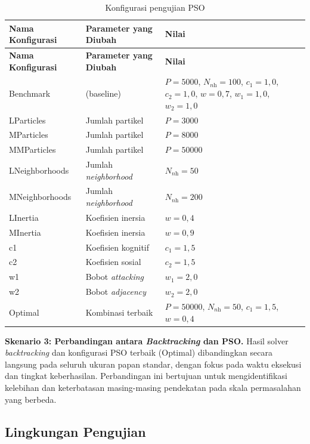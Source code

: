 \begin{longtable}{lp{4cm}p{5.5cm}}
	\caption{Konfigurasi pengujian PSO}
	\label{tab:skenario-pso} \\
	\toprule
	\textbf{Nama Konfigurasi} & \textbf{Parameter yang Diubah} & \textbf{Nilai} \\
	\midrule
	\endfirsthead
	\toprule
	\textbf{Nama Konfigurasi} & \textbf{Parameter yang Diubah} & \textbf{Nilai} \\
	\midrule
	\endhead
	\bottomrule
	\endfoot
	Benchmark & (baseline) & $P{=}5000$, $N_{\textit{nh}}{=}100$, $c_1{=}1{,}0$, $c_2{=}1{,}0$, $w{=}0{,}7$, $w_1{=}1{,}0$, $w_2{=}1{,}0$ \\
	\midrule
	LParticles & Jumlah partikel & $P = 3000$ \\
	\midrule
	MParticles & Jumlah partikel & $P = 8000$ \\
	\midrule
	MMParticles & Jumlah partikel & $P = 50000$ \\
	\midrule
	LNeighborhoods & Jumlah \textit{neighborhood} & $N_{\textit{nh}} = 50$ \\
	\midrule
	MNeighborhoods & Jumlah \textit{neighborhood} & $N_{\textit{nh}} = 200$ \\
	\midrule
	LInertia & Koefisien inersia & $w = 0{,}4$ \\
	\midrule
	MInertia & Koefisien inersia & $w = 0{,}9$ \\
	\midrule
	c1 & Koefisien kognitif & $c_1 = 1{,}5$ \\
	\midrule
	c2 & Koefisien sosial & $c_2 = 1{,}5$ \\
	\midrule
	w1 & Bobot \textit{attacking} & $w_1 = 2{,}0$ \\
	\midrule
	w2 & Bobot \textit{adjacency} & $w_2 = 2{,}0$ \\
	\midrule
	Optimal & Kombinasi terbaik & $P{=}50000$, $N_{\textit{nh}}{=}50$, $c_1{=}1{,}5$, $w{=}0{,}4$ \\
	\bottomrule
\end{longtable}

\textbf{Skenario 3: Perbandingan antara \textit{Backtracking} dan PSO.} Hasil solver \textit{backtracking} dan konfigurasi PSO terbaik (Optimal) dibandingkan secara langsung pada seluruh ukuran papan standar, dengan fokus pada waktu eksekusi dan tingkat keberhasilan. Perbandingan ini bertujuan untuk mengidentifikasi kelebihan dan keterbatasan masing-masing pendekatan pada skala permasalahan yang berbeda.

\subsection{Lingkungan Pengujian}
\label{subsec:lingkungan-pengujian}


